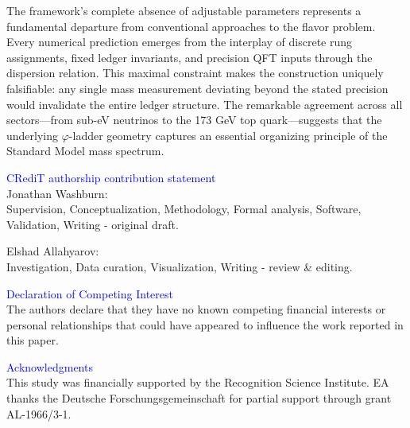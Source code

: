 \documentclass[%
amsmath,amssymb,
aps,
prb,
floatfix,showkeys
]{revtex4-2}
\newcommand{\modif}[1]{\textcolor{blue}{#1}}
\begin{document}
The framework's complete absence of adjustable parameters represents a fundamental departure from conventional approaches to the flavor problem. Every numerical prediction emerges from the interplay of discrete rung assignments, fixed ledger invariants, and precision QFT inputs through the dispersion relation. This maximal constraint makes the construction uniquely falsifiable: any single mass measurement deviating beyond the stated precision would invalidate the entire ledger structure. The remarkable agreement across all sectors—from sub-eV neutrinos to the 173 GeV top quark—suggests that the underlying $\varphi$-ladder geometry captures an essential organizing principle of the Standard Model mass spectrum.

\onecolumngrid

\vspace{0.3cm}

{\modif{CRediT authorship contribution statement}} \\
Jonathan Washburn: \\
Supervision,
Conceptualization,
Methodology,
Formal analysis,
Software,
Validation,
Writing - original draft.

\vspace{0.20cm}

Elshad Allahyarov: \\
Investigation,
Data curation,
Visualization,
Writing - review \& editing.

{\modif{Declaration of Competing Interest}} \\
The authors declare that they have no known competing financial interests or personal relationships that could have appeared to influence the work reported in this paper.

{\modif{Acknowledgments}} \\
This study was financially supported by the Recognition Science Institute. EA thanks the Deutsche Forschungsgemeinschaft for partial support through grant AL-1966/3-1.
\end{document}
